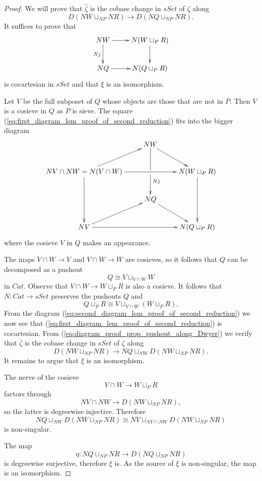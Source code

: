\begin{proof}
We will prove that $\hat{\zeta }$ is the cobase change in $sSet$ of $\zeta$ along
\[D(NW\sqcup _{NP}NR)\to D(NQ\sqcup _{NP}NR).\]
It suffices to prove that
\begin{equation}
\label{eq:first_diagram_lem_proof_of_second_reduction}
\begin{gathered}
\xymatrix{
NW \ar[d]_{Nj} \ar[r] & N(W\sqcup _PR) \ar[d] \\
NQ \ar[r] & N(Q\sqcup _PR)
}
\end{gathered}
\end{equation}
is cocartesian in $sSet$ and that $\xi$ is an isomorphism.

Let $V$ be the full subposet of $Q$ whose objects are those that are not in $P$. Then $V$ is a cosieve in $Q$ as $P$ is sieve. The square (\ref{eq:first_diagram_lem_proof_of_second_reduction}) fits into the bigger diagram
\begin{equation}
\label{eq:second_diagram_lem_proof_of_second_reduction}
\begin{gathered}
\xymatrix{
& NW \ar@{-}[d] \ar[dr] \\
NV\cap NW=N(V\cap W) \ar[dd] \ar[ur] \ar[rr] & \ar[d]^(.35){Nj} & N(W\sqcup _PR) \ar[dd] \\
& NQ \ar[dr] \\
NV \ar[rr] \ar[ur] && N(Q\sqcup _PR)
}
\end{gathered}
\end{equation}
where the cosieve $V$ in $Q$ makes an appearance.

The maps $V\cap W\to V$ and $V\cap W\to W$ are cosieves, so it follows that $Q$ can be decomposed as a pushout
\[Q\cong V\sqcup _{V\cap W}W\]
in $Cat$. Observe that $V\cap W\to W\sqcup _PR$ is also a cosieve. It follows that $N:Cat\to sSet$ preserves the pushouts $Q$ and
\[Q\sqcup _PR\cong V\sqcup _{V\cap W}(W\sqcup _PR).\]
From the diagram (\ref{eq:second_diagram_lem_proof_of_second_reduction}) we now see that (\ref{eq:first_diagram_lem_proof_of_second_reduction}) is cocartesian. From (\ref{eq:diagram_proof_prop_pushout_along_Dwyer}) we verify that $\bar{\zeta }$ is the cobase change in $sSet$ of $\zeta$ along
\[D(NW\sqcup _{NP}NR)\to NQ\sqcup _{NW}D(NW\sqcup _{NP}NR).\]
It remains to argue that $\xi$ is an isomorphism.

The nerve of the cosieve
\[V\cap W\to W\sqcup _PR\]
factors through
\[NV\cap NW\to D(NW\sqcup _{NP}NR),\]
so the latter is degreewise injective. Therefore
\[NQ\sqcup _{NW}D(NW\sqcup _{NP}NR)\cong NV\sqcup _{NV\cap NW}D(NW\sqcup _{NP}NR)\]
is non-singular.

The map
\[\eta :NQ\sqcup _{NP}NR\to D(NQ\sqcup _{NP}NR)\]
is degreewise surjective, therefore $\xi$ is. As the source of $\xi$ is non-singular, the map is an isomorphism.
\end{proof}






